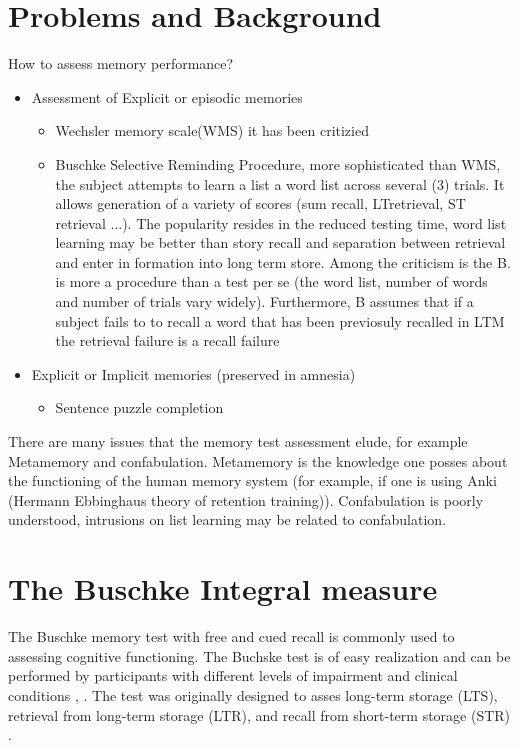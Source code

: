\documentclass[9pt,twocolumn,twoside]{pnas-new}
\begin{document}
\section*{Problems and Background}
How to assess memory performance?
\begin{itemize}
\item Assessment of Explicit or episodic memories 
\begin{itemize}
  \item Wechsler memory scale(WMS) it has been critizied
  \item Buschke Selective Reminding Procedure, more sophisticated than WMS, the subject attempts to learn a list a word list across several (3) trials. It allows generation of a variety of scores (sum recall, LTretrieval, ST retrieval ...). The popularity resides in the reduced testing time, word list learning may be better than story recall and separation between retrieval and enter in formation into long term store. Among the criticism is the B. is more a procedure than a test per se (the word list, number of words and number of trials vary widely). Furthermore, B assumes that if a subject fails to to recall a word that has been previosuly recalled in LTM the retrieval failure is a recall failure
\end{itemize}  
\item Explicit or Implicit memories (preserved in amnesia)
\begin{itemize}
\item  Sentence puzzle completion
\end{itemize}
\end{itemize}  
There are many issues that the memory test assessment elude, for example Metamemory and confabulation. Metamemory is the knowledge one posses about the functioning of the human memory system (for example, if one is using Anki (Hermann Ebbinghaus theory of retention training)). Confabulation is poorly understood, intrusions on list learning may be related to confabulation.



\section*{The Buschke Integral measure}

The Buschke memory test with free and cued recall is commonly used to assessing cognitive functioning. The Buchske test is of easy realization and can be performed by participants with different levels of impairment and clinical conditions \cite{o200212}, \cite{leitner2017comparison}. The test was originally designed to asses long-term storage (LTS), retrieval from long-term storage (LTR), and recall from short-term storage (STR) \cite{buschke1973selective}.
\end{document}
